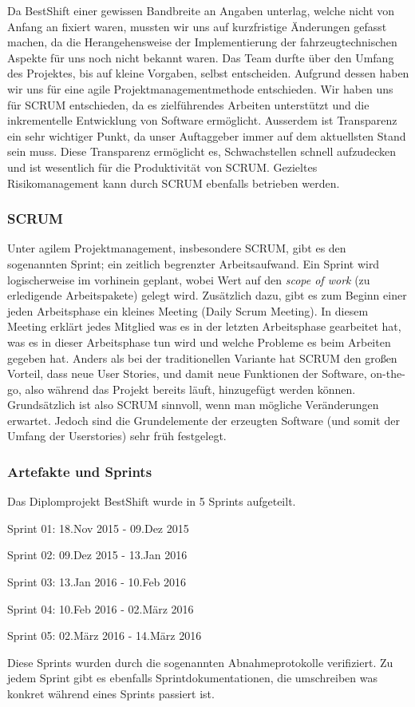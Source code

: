 
Da BestShift einer gewissen Bandbreite an Angaben unterlag, welche nicht von Anfang an fixiert waren,
mussten wir uns auf kurzfristige Änderungen gefasst machen, da die Herangehensweise der Implementierung der fahrzeugtechnischen Aspekte für uns noch nicht bekannt waren.
Das Team durfte über den Umfang des Projektes, bis auf kleine Vorgaben, selbst entscheiden.
Aufgrund dessen haben wir uns für eine agile Projektmanagementmethode entschieden. 
Wir haben uns für SCRUM entschieden, da es zielführendes Arbeiten unterstützt und die inkrementelle Entwicklung von Software ermöglicht. 
Ausserdem ist Transparenz ein sehr wichtiger Punkt, da unser Auftaggeber immer auf dem aktuellsten Stand sein muss. Diese Transparenz ermöglicht es, Schwachstellen schnell aufzudecken und ist wesentlich für die Produktivität von SCRUM.
Gezieltes Risikomanagement kann durch SCRUM ebenfalls betrieben werden. 

\subsubsection{SCRUM}
Unter agilem Projektmanagement, insbesondere SCRUM, gibt es den sogenannten
Sprint; ein zeitlich begrenzter Arbeitsaufwand. Ein Sprint wird logischerweise im vorhinein geplant, wobei Wert auf den \textit{scope of work} (zu erledigende Arbeitspakete) gelegt wird. 
Zusätzlich dazu, gibt es zum Beginn einer jeden
Arbeitsphase ein kleines Meeting (Daily Scrum Meeting). In diesem Meeting erklärt jedes Mitglied was es in der letzten Arbeitsphase gearbeitet hat, was es in dieser Arbeitsphase tun wird und welche Probleme es beim Arbeiten gegeben hat.
Anders als bei der traditionellen Variante hat SCRUM den großen Vorteil, dass neue User Stories, und damit neue Funktionen der Software, on-the-go, also während das Projekt bereits läuft, hinzugefügt werden können. 
Grundsätzlich ist also SCRUM sinnvoll, wenn man mögliche Veränderungen erwartet. Jedoch sind die Grundelemente der erzeugten Software (und somit der Umfang der Userstories) sehr früh festgelegt.

\subsubsection{Artefakte und Sprints}
Das Diplomprojekt BestShift wurde in 5 Sprints aufgeteilt.
\begin{description}
\item Sprint 01: 18.Nov 2015 - 09.Dez 2015
\item Sprint 02: 09.Dez 2015 - 13.Jan 2016
\item Sprint 03: 13.Jan 2016 - 10.Feb 2016
\item Sprint 04: 10.Feb 2016 - 02.März 2016
\item Sprint 05: 02.März 2016 - 14.März 2016
\end{description}

Diese Sprints wurden durch die sogenannten Abnahmeprotokolle verifiziert.
Zu jedem Sprint gibt es ebenfalls Sprintdokumentationen, die umschreiben was konkret während eines Sprints passiert ist.


\clearpage %